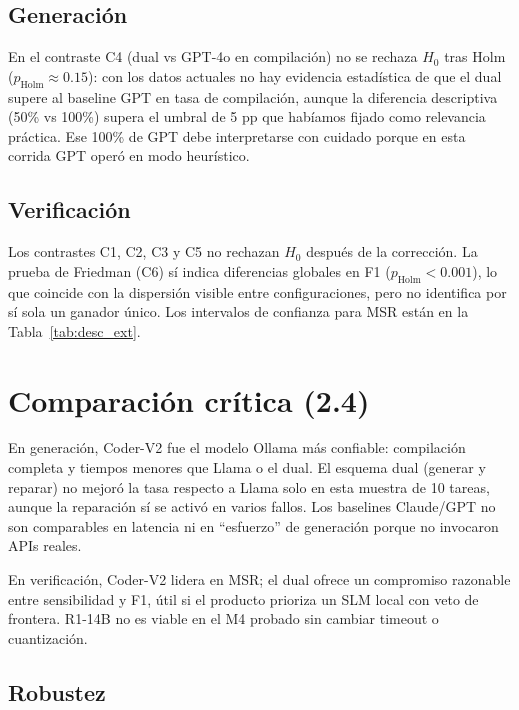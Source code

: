 \subsection{Generación}



En el contraste C4 (dual vs GPT-4o en compilación) no se rechaza $H_0$ tras Holm ($p_{\mathrm{Holm}} \approx 0.15$): con los datos actuales no hay evidencia estadística de que el dual supere al baseline GPT en tasa de compilación, aunque la diferencia descriptiva (50\% vs 100\%) supera el umbral de 5 pp que habíamos fijado como relevancia práctica. Ese 100\% de GPT debe interpretarse con cuidado porque en esta corrida GPT operó en modo heurístico.

\subsection{Verificación}



Los contrastes C1, C2, C3 y C5 no rechazan $H_0$ después de la corrección. La prueba de Friedman (C6) sí indica diferencias globales en F1 ($p_{\mathrm{Holm}} < 0.001$), lo que coincide con la dispersión visible entre configuraciones, pero no identifica por sí sola un ganador único. Los intervalos de confianza para MSR están en la Tabla~\ref{tab:desc_ext}.

\section{Comparación crítica (2.4)}

En generación, Coder-V2 fue el modelo Ollama más confiable: compilación completa y tiempos menores que Llama o el dual. El esquema dual (generar y reparar) no mejoró la tasa respecto a Llama solo en esta muestra de 10 tareas, aunque la reparación sí se activó en varios fallos. Los baselines Claude/GPT no son comparables en latencia ni en “esfuerzo” de generación porque no invocaron APIs reales.

En verificación, Coder-V2 lidera en MSR; el dual ofrece un compromiso razonable entre sensibilidad y F1, útil si el producto prioriza un SLM local con veto de frontera. R1-14B no es viable en el M4 probado sin cambiar timeout o cuantización.

\subsection{Robustez}

